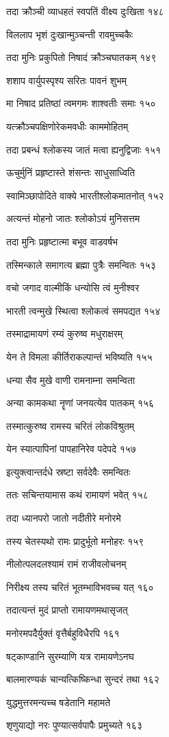 तदा क्रौञ्ची व्याधहतं स्वपतिं वीक्ष्य दुःखिता १४८

विललाप भृशं दुःखान्मुञ्चन्ती रावमुच्चकैः

तदा मुनिः प्रकुपितो निषादं क्रौञ्चघातकम् १४९

शशाप वार्युपस्पृश्य सरितः पावनं शुभम्

मा निषाद प्रतिष्ठां त्वमगमः शाश्वतीः समाः १५०

यत्क्रौञ्चपक्षिणोरेकमवधीः काममोहितम्

तदा प्रबन्धं श्लोकस्य जातं मत्वा ह्यनुद्विजाः १५१

ऊचुर्मुनिं प्रहृष्टास्ते शंसन्तः साधुसाध्विति

स्वामिञ्छापोदिते वाक्ये भारतीश्लोकमातनोत् १५२

अत्यन्तं मोहनो जातः श्लोकोऽयं मुनिसत्तम

तदा मुनिः प्रहृष्टात्मा बभूव वाडवर्षभ

तस्मिन्काले समागत्य ब्रह्मा पुत्रैः समन्वितः १५३

वचो जगाद वाल्मीकिं धन्योसि त्वं मुनीश्वर

भारती त्वन्मुखे स्थित्वा श्लोकत्वं समपद्यत १५४

तस्माद्रामायणं रम्यं कुरुष्व मधुराक्षरम्

येन ते विमला कीर्तिराकल्पान्तं भविष्यति १५५

धन्या सैव मुखे वाणी रामनाम्ना समन्विता

अन्या कामकथा नॄणां जनयत्येव पातकम् १५६

तस्मात्कुरुष्व रामस्य चरितं लोकविश्रुतम्

येन स्यात्पापिनां पापहानिरेव पदेपदे १५७

इत्युक्त्वान्तर्दधे स्रष्टा सर्वदेवैः समन्वितः

ततः सचिन्तयामास कथं रामायणं भवेत् १५८

तदा ध्यानपरो जातो नदीतीरे मनोरमे

तस्य चेतस्यथो रामः प्रादुर्भूतो मनोहरः १५९

नीलोत्पलदलश्यामं रामं राजीवलोचनम्

निरीक्ष्य तस्य चरितं भूतम्भाविभवच्च यत् १६०

तदात्यन्तं मुदं प्राप्तो रामायणमथासृजत्

मनोरमपदैर्युक्तं वृत्तैर्बहुविधैरपि १६१

षट्काण्डानि सुरम्याणि यत्र रामायणेऽनघ

बालमारण्यकं चान्यत्किष्किन्धा सुन्दरं तथा १६२

युद्धमुत्तरमन्यच्च षडेतानि महामते

शृणुयाद्यो नरः पुण्यात्सर्वपापैः प्रमुच्यते १६३

